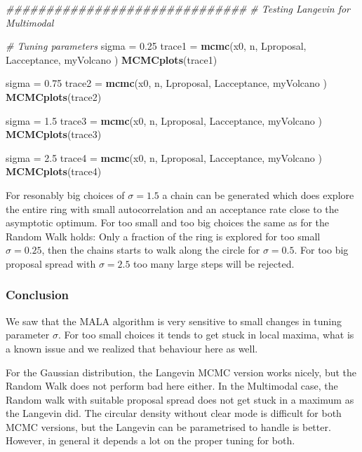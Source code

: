 \documentclass[
]{article}
\newenvironment{Shaded}{\begin{snugshade}}{\end{snugshade}}
\newcommand{\CommentTok}[1]{\textcolor[rgb]{0.56,0.35,0.01}{\textit{#1}}}
\newcommand{\FloatTok}[1]{\textcolor[rgb]{0.00,0.00,0.81}{#1}}
\newcommand{\KeywordTok}[1]{\textcolor[rgb]{0.13,0.29,0.53}{\textbf{#1}}}
\newcommand{\NormalTok}[1]{#1}
\newcommand{\StringTok}[1]{\textcolor[rgb]{0.31,0.60,0.02}{#1}}
\begin{document}
\begin{Shaded}
\begin{Highlighting}[]
\CommentTok{##############################}
\CommentTok{# Testing Langevin for Multimodal}

\CommentTok{# Tuning parameters}
\NormalTok{sigma =}\StringTok{ }\FloatTok{0.25}
\NormalTok{trace1 =}\StringTok{ }\KeywordTok{mcmc}\NormalTok{(x0, n, Lproposal, Lacceptance, myVolcano )}
\KeywordTok{MCMCplots}\NormalTok{(trace1)}

\NormalTok{sigma =}\StringTok{ }\FloatTok{0.75}
\NormalTok{trace2 =}\StringTok{ }\KeywordTok{mcmc}\NormalTok{(x0, n, Lproposal, Lacceptance, myVolcano )}
\KeywordTok{MCMCplots}\NormalTok{(trace2)}

\NormalTok{sigma =}\StringTok{ }\FloatTok{1.5}
\NormalTok{trace3 =}\StringTok{ }\KeywordTok{mcmc}\NormalTok{(x0, n, Lproposal, Lacceptance, myVolcano )}
\KeywordTok{MCMCplots}\NormalTok{(trace3)}

\NormalTok{sigma =}\StringTok{ }\FloatTok{2.5}
\NormalTok{trace4 =}\StringTok{ }\KeywordTok{mcmc}\NormalTok{(x0, n, Lproposal, Lacceptance, myVolcano )}
\KeywordTok{MCMCplots}\NormalTok{(trace4)}
\end{Highlighting}
\end{Shaded}

For resonably big choices of \(\sigma=1.5\) a chain can be generated
which does explore the entire ring with small autocorrelation and an
acceptance rate close to the asymptotic optimum. For too small and too
big choices the same as for the Random Walk holds: Only a fraction of
the ring is explored for too small \(\sigma=0.25\), then the chains
starts to walk along the circle for \(\sigma=0.5\). For too big proposal
spread with \(\sigma=2.5\) too many large steps will be rejected.

\hypertarget{conclusion-1}{%
\subsubsection{Conclusion}\label{conclusion-1}}

We saw that the MALA algorithm is very sensitive to small changes in
tuning parameter \(\sigma\). For too small choices it tends to get stuck
in local maxima, what is a known issue and we realized that behaviour
here as well.

For the Gaussian distribution, the Langevin MCMC version works nicely,
but the Random Walk does not perform bad here either. In the Multimodal
case, the Random walk with suitable proposal spread does not get stuck
in a maximum as the Langevin did. The circular density without clear
mode is difficult for both MCMC versions, but the Langevin can be
parametrised to handle is better. However, in general it depends a lot
on the proper tuning for both.
\end{document}
